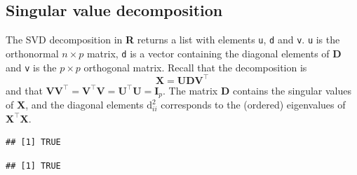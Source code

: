 \documentclass[]{book}
\newenvironment{Shaded}{\begin{snugshade}}{\end{snugshade}}
\newcommand{\KeywordTok}[1]{\textcolor[rgb]{0.13,0.29,0.53}{\textbf{#1}}}
\newcommand{\StringTok}[1]{\textcolor[rgb]{0.31,0.60,0.02}{#1}}
\newcommand{\CommentTok}[1]{\textcolor[rgb]{0.56,0.35,0.01}{\textit{#1}}}
\newcommand{\OperatorTok}[1]{\textcolor[rgb]{0.81,0.36,0.00}{\textbf{#1}}}
\newcommand{\NormalTok}[1]{#1}
\theoremstyle{definition}
\theoremstyle{definition}
\theoremstyle{definition}
\theoremstyle{remark}
\begin{document}
\subsection{Singular value
decomposition}\label{singular-value-decomposition}

The SVD decomposition in \textbf{R} returns a list with elements
\texttt{u}, \texttt{d} and \texttt{v}. \texttt{u} is the orthonormal
\(n \times p\) matrix, \texttt{d} is a vector containing the diagonal
elements of \(\mathbf{D}\) and \texttt{v} is the \(p \times p\)
orthogonal matrix. Recall that the decomposition is
\[\mathbf{X} = \mathbf{UDV}^\top\] and that
\(\mathbf{VV}^\top= \mathbf{V}^\top\mathbf{V}=\mathbf{U}^\top\mathbf{U}=\mathbf{I}_p\).
The matrix \(\mathbf{D}\) contains the singular values of
\(\mathbf{X}\), and the diagonal elements \(\mathrm{d}_{ii}^2\)
corresponds to the (ordered) eigenvalues of
\(\mathbf{X}^\top\mathbf{X}\).

\begin{Shaded}
\end{Shaded}

\begin{verbatim}
## [1] TRUE
\end{verbatim}

\begin{Shaded}
\end{Shaded}

\begin{verbatim}
## [1] TRUE
\end{verbatim}

\begin{Shaded}
\end{Shaded}
\end{document}
